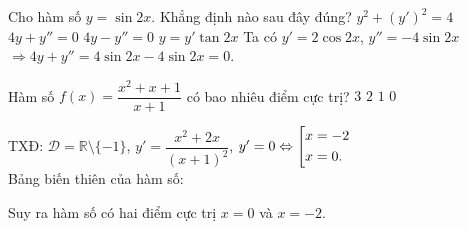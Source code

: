 \begin{ex}%
Cho hàm số $y=\sin2x$. Khẳng định nào sau đây đúng?
\choice
{$y^2+(y')^2=4$}
{\True $4y+y''=0$}
{$4y-y''=0$}
{$y=y'\tan2x$}
\loigiai
{
Ta có $y'=2\cos2x$, $y''=-4\sin2x$ $\Rightarrow 4y+y''=4\sin2x-4\sin2x=0$.
}
\end{ex}


\begin{ex}%
Hàm số $f(x)=\dfrac{x^2+x+1}{x+1}$ có bao nhiêu điểm cực trị?
\choice
{$3$}
{\True $2$}
{$1$}
{$0$}
\loigiai
{
TXĐ: $\mathscr{D}=\mathbb{R}\setminus\{-1\}$, $y'=\dfrac{x^2+2x}{(x+1)^2}$, $y'=0\Leftrightarrow\left[\begin{aligned}&x=-2\\&x=0.\end{aligned}\right.$\\
Bảng biến thiên của hàm số:
\begin{center}
\end{center}
Suy ra hàm số có hai điểm cực trị $x=0$ và $x=-2$.
}
\end{ex}


